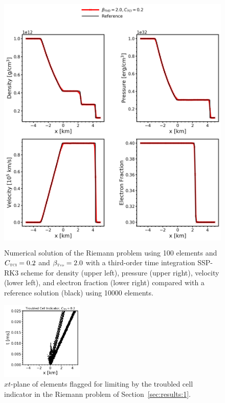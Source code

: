 \documentclass[onecolumn]{aastex62}
\newcommand{\TVD}{\textnormal{\tiny\textsc{Tvd}}}
\newcommand{\TCI}{\textnormal{\tiny\textsc{TCI}}}
\begin{document}
\begin{figure}[h!]
  \centering
  \includegraphics[width=32pc,height=30pc]{optimal.png}
  \centering
  \caption{\label{fig:SodSedovOptimal} Numerical solution of the Riemann problem using
    100 elements and $C_{\TCI} = 0.2$ and $\beta_{\TVD} = 2.0$ with a third-order
    time integration SSP-RK3 scheme for density (upper left), pressure (upper right),
    velocity (lower left), and electron fraction (lower right)
    compared with a reference solution (black) using 10000 elements.}
\end{figure}
\begin{figure}
  \includegraphics[width=0.35\textwidth]{optimal_shock.png}
  \caption{$xt$-plane of elements flagged for limiting by the troubled cell indicator
  in the Riemann problem of Section~\ref{sec:results:1}.}
  \label{fig:shock}
\end{figure}
\end{document}
